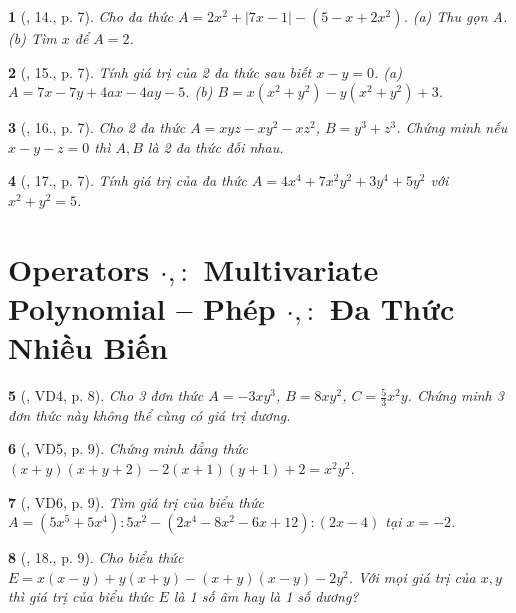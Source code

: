 \documentclass{article}
\newtheorem{baitoan}{}
\begin{document}
\begin{baitoan}[\cite{Tuyen_Toan_8}, 14., p. 7]
	Cho đa thức $A = 2x^2 + |7x - 1| - (5 - x + 2x^2)$. (a) Thu gọn A. (b) Tìm $x$ để $A = 2$.
\end{baitoan}

\begin{baitoan}[\cite{Tuyen_Toan_8}, 15., p. 7]
	Tính giá trị của 2 đa thức sau biết $x - y = 0$. (a) $A = 7x - 7y + 4ax - 4ay - 5$. (b) $B = x(x^2 + y^2) - y(x^2 + y^2) + 3$.
\end{baitoan}

\begin{baitoan}[\cite{Tuyen_Toan_8}, 16., p. 7]
	Cho 2 đa thức $A = xyz - xy^2 - xz^2$, $B = y^3 + z^3$. Chứng minh nếu $x - y - z = 0$ thì $A,B$ là 2 đa thức đối nhau.
\end{baitoan}

\begin{baitoan}[\cite{Tuyen_Toan_8}, 17., p. 7]
	Tính giá trị của đa thức $A = 4x^4 + 7x^2y^2 + 3y^4 + 5y^2$ với $x^2 + y^2 = 5$.
\end{baitoan}


\section{Operators $\cdot,:$ Multivariate Polynomial -- Phép $\cdot,:$ Đa Thức Nhiều Biến}

\begin{baitoan}[\cite{Tuyen_Toan_8}, VD4, p. 8]
	Cho 3 đơn thức $A = -3xy^3$, $B = 8xy^2$, $C = \frac{5}{3}x^2y$. Chứng minh 3 đơn thức này không thể cùng có giá trị dương.
\end{baitoan}

\begin{baitoan}[\cite{Tuyen_Toan_8}, VD5, p. 9]
	Chứng minh đẳng thức $(x + y)(x + y + 2) - 2(x + 1)(y + 1) + 2 = x^2y^2$.
\end{baitoan}

\begin{baitoan}[\cite{Tuyen_Toan_8}, VD6, p. 9]
	Tìm giá trị của biểu thức $A = (5x^5 + 5x^4):5x^2 - (2x^4 - 8x^2 - 6x + 12):(2x - 4)$ tại $x = -2$.
\end{baitoan}

\begin{baitoan}[\cite{Tuyen_Toan_8}, 18., p. 9]
	Cho biểu thức $E = x(x - y) + y(x + y) - (x + y)(x - y) - 2y^2$. Với mọi giá trị của $x,y$ thì giá trị của biểu thức $E$ là 1 số âm hay là 1 số dương?
\end{baitoan}
\end{document}

